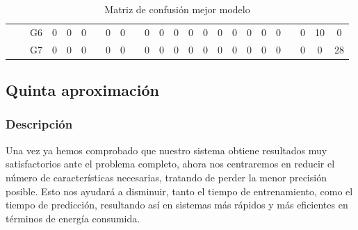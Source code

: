 \documentclass[12pt]{article}
\begin{document}
\begin{table}[!ht]
{\begin{tabular}{clcccccccccccccccccccccc}
								   & \multicolumn{1}{l|}{}                   & \multicolumn{1}{c|}{G6}   & \multicolumn{1}{c|}{0}    & \multicolumn{1}{c|}{0}    & \multicolumn{1}{c|}{0}    & \multicolumn{1}{c|}{}                     & \multicolumn{1}{c|}{0}    & \multicolumn{1}{c|}{0}  & \multicolumn{1}{c|}{}                     & \multicolumn{1}{c|}{0}  & \multicolumn{1}{c|}{0}  & \multicolumn{1}{c|}{0}  & \multicolumn{1}{c|}{0}  & \multicolumn{1}{c|}{0}    & \multicolumn{1}{c|}{0}    & \multicolumn{1}{c|}{0}    & \multicolumn{1}{c|}{0}    & \multicolumn{1}{c|}{0}    & \multicolumn{1}{c|}{0}    & \multicolumn{1}{c|}{}                     & \multicolumn{1}{c|}{0}  & \multicolumn{1}{c|}{10} & \multicolumn{1}{c|}{0}  \\ \cline{3-6} \cline{8-9} \cline{11-20} \cline{22-24} 
								   & \multicolumn{1}{l|}{}                   & \multicolumn{1}{c|}{G7}   & \multicolumn{1}{c|}{0}    & \multicolumn{1}{c|}{0}    & \multicolumn{1}{c|}{0}    & \multicolumn{1}{c|}{}                     & \multicolumn{1}{c|}{0}    & \multicolumn{1}{c|}{0}  & \multicolumn{1}{c|}{}                     & \multicolumn{1}{c|}{0}  & \multicolumn{1}{c|}{0}  & \multicolumn{1}{c|}{0}  & \multicolumn{1}{c|}{0}  & \multicolumn{1}{c|}{0}    & \multicolumn{1}{c|}{0}    & \multicolumn{1}{c|}{0}    & \multicolumn{1}{c|}{0}    & \multicolumn{1}{c|}{0}    & \multicolumn{1}{c|}{0}    & \multicolumn{1}{c|}{}                     & \multicolumn{1}{c|}{0}  & \multicolumn{1}{c|}{0}  & \multicolumn{1}{c|}{28} \\ \cline{3-24} 
			\end{tabular}
	}
	\caption{Matriz de confusión mejor modelo}
	\label{tab:confusion_matrix_4}
\end{table}
\newpage

\subsection{Quinta aproximación}
\label{Quinta aproximación}

\subsubsection{Descripción}
Una vez ya hemos comprobado que nuestro sistema obtiene resultados muy satisfactorios ante el problema completo, ahora
nos centraremos en reducir el número de características necesarias, tratando de perder la menor precisión posible.
Esto nos ayudará a disminuir, tanto el tiempo de entrenamiento, como el tiempo de predicción, resultando así 
en sistemas más rápidos y más eficientes en términos de energía consumida.
\end{document}
